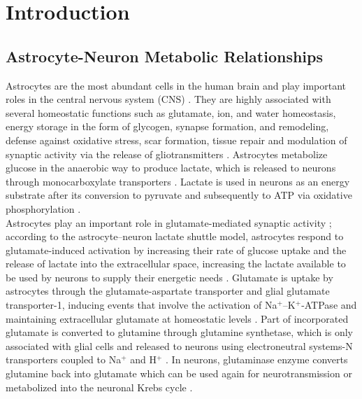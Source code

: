 \section{Introduction}
\subsection*{Astrocyte-Neuron Metabolic Relationships}
Astrocytes are the most abundant cells in the human brain and play important roles in the central nervous system (CNS) \cite{Takuma2004}. They are highly associated with several homeostatic functions such as glutamate, ion, and water homeostasis, energy storage in the form of glycogen, synapse formation, and remodeling, defense against oxidative stress, scar formation, tissue repair and modulation of synaptic activity via the release of gliotransmitters \cite{Lange2012}. Astrocytes metabolize glucose in the anaerobic way to produce lactate, which is released to neurons through monocarboxylate transporters \cite{Kimelberg2010}. Lactate is used in neurons as an energy substrate after its conversion to pyruvate and subsequently to ATP via oxidative phosphorylation \cite{Allen2009}.\\

Astrocytes play an important role in glutamate-mediated synaptic activity \cite{Halassa2010}; according to the astrocyte–neuron lactate shuttle model, astrocytes respond to glutamate-induced activation by increasing their rate of glucose uptake and the release of lactate into the extracellular space, increasing the lactate available to be used by neurons to supply their energetic needs \cite{Giaume2010}. Glutamate is uptake by astrocytes through the glutamate-aspartate transporter and glial glutamate transporter-1, inducing events that involve the activation of Na$^+$–K$^+$-ATPase and maintaining extracellular glutamate at homeostatic levels \cite{Nijboer2013}. Part of incorporated glutamate is converted to glutamine through glutamine synthetase, which is only associated with glial cells and released to neurons using electroneutral systems-N transporters coupled to Na$^+$ and H$^+$ \cite{Barres2008}. In neurons, glutaminase enzyme converts glutamine back into glutamate which can be used again for neurotransmission or metabolized into the neuronal Krebs cycle \cite{Shen2013}.\\

